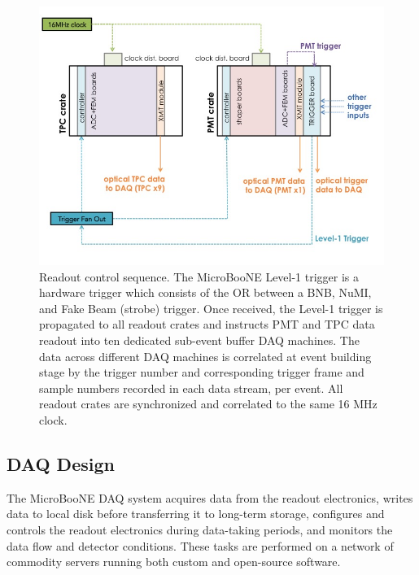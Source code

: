 \begin{figure}
\centering
\includegraphics[width=0.8\linewidth]{./figures/det_figure_10.jpg}%
\caption{\label{fig:readout_10}Readout control sequence. The MicroBooNE Level-1 trigger is a hardware trigger which consists of the OR between a BNB, NuMI, and Fake Beam (strobe) trigger. Once received, the Level-1 trigger is propagated to all readout crates and instructs PMT and TPC data readout into ten dedicated sub-event buffer DAQ machines. The data across different DAQ machines is correlated at event building stage by the trigger number and corresponding trigger frame and sample numbers recorded in each data stream, per event. All readout crates are synchronized and correlated to the same 16 MHz clock.}
\end{figure}

%
\subsection{DAQ Design}
\label{sec:daq}
The MicroBooNE DAQ system acquires data from the readout electronics, writes data to local disk before transferring it to long-term storage, configures and controls the readout electronics during data-taking periods, and monitors the data flow and detector conditions. These tasks are performed on a network of commodity servers running both custom and open-source software.

